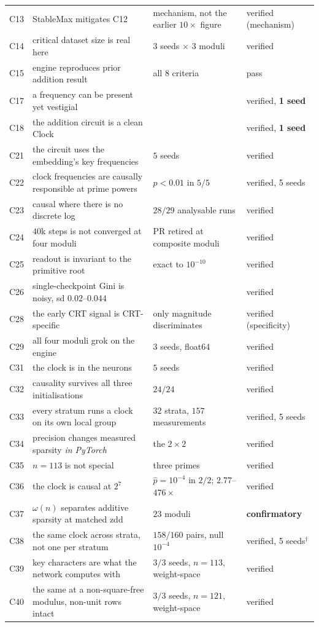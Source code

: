 \begin{center}
\begin{tabular}{l p{} p{} p{}}
  C13 & StableMax mitigates C12 & mechanism, not the earlier $10\times$ figure & verified (mechanism) \\
  C14 & critical dataset size is real here & $3$ seeds $\times$ $3$ moduli & verified \\
  C15 & engine reproduces prior addition result & all $8$ criteria & pass \\
  C17 & a frequency can be present yet vestigial & & verified, \textbf{1 seed} \\
  C18 & the addition circuit is a clean Clock & & verified, \textbf{1 seed} \\
  C21 & the circuit uses the embedding's key frequencies & $5$ seeds & verified \\
  C22 & clock frequencies are causally responsible at prime powers & $p<0.01$ in $5/5$ & verified, 5 seeds \\
  C23 & causal where there is no discrete log & $28/29$ analysable runs & verified \\
  C24 & $40$k steps is not converged at four moduli & PR retired at composite moduli & verified \\
  C25 & readout is invariant to the primitive root & exact to $10^{-10}$ & verified \\
  C26 & single-checkpoint Gini is noisy, sd $0.02$--$0.044$ & & verified \\
  C28 & the early CRT signal is CRT-specific & only magnitude discriminates & verified (specificity) \\
  C29 & all four moduli grok on the engine & $3$ seeds, float64 & verified \\
  C31 & the clock is in the neurons & $5$ seeds & verified \\
  C32 & causality survives all three initialisations & $24/24$ & verified \\
  C33 & every stratum runs a clock on its own local group & $32$ strata, $157$ measurements & verified, 5 seeds \\
  C34 & precision changes measured sparsity \emph{in PyTorch} & the $2\times2$ & verified \\
  C35 & $n=113$ is not special & three primes & verified \\
  C36 & the clock is causal at $2^{7}$ & $\hat{p}=10^{-4}$ in $2/2$; $2.77$--$476\times$ & verified \\
  C37 & $\omega(n)$ separates additive sparsity at matched zdd & $23$ moduli & \textbf{confirmatory} \\
  C38 & the same clock across strata, not one per stratum & $158/160$ pairs, null $10^{-4}$ & verified, 5 seeds$^{\dagger}$ \\
  C39 & key characters are what the network computes with & $3/3$ seeds, $n=113$, weight-space & verified \\
  C40 & the same at a non-square-free modulus, non-unit rows intact & $3/3$ seeds, $n=121$, weight-space & verified \\
  \bottomrule
\end{tabular}
\end{center}

